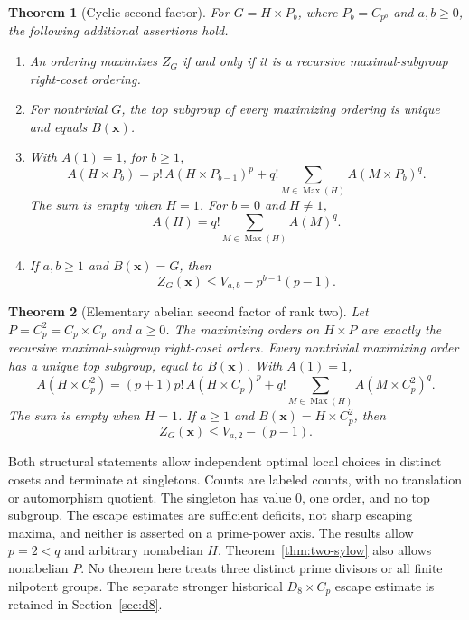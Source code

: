 \documentclass[11pt,letterpaper]{article}
\newtheorem{theorem}{Theorem}
\theoremstyle{definition}\newtheorem{definition}{Definition}
\newcommand{\Max}{\operatorname{Max}}
\begin{document}
\begin{theorem}[Cyclic second factor]\label{thm:main}
For $G=H\times P_b$, where $P_b=C_{p^b}$ and $a,b\ge0$, the following additional assertions hold.
\begin{enumerate}
\item An ordering maximizes $Z_G$ if and only if it is a recursive maximal-subgroup right-coset ordering.
\item For nontrivial $G$, the top subgroup of every maximizing ordering is unique and equals $B(\mathbf{x})$.
\item With $A(1)=1$, for $b\ge1$,
\begin{equation}
A(H\times P_b)=p!\,A(H\times P_{b-1})^p
 +q!\sum_{M\in\Max(H)}A(M\times P_b)^q.\label{eq:count}
\end{equation}
The sum is empty when $H=1$. For $b=0$ and $H\ne1$,
\begin{equation}
A(H)=q!\sum_{M\in\Max(H)}A(M)^q.\label{eq:qcount}
\end{equation}
\item If $a,b\ge1$ and $B(\mathbf{x})=G$, then
\begin{equation}
Z_G(\mathbf{x})\le V_{a,b}-p^{b-1}(p-1).\label{eq:escape}
\end{equation}
\end{enumerate}
\end{theorem}

\begin{theorem}[Elementary abelian second factor of rank two]\label{thm:ranktwo}
Let $P=C_p^2=C_p\times C_p$ and $a\ge0$. The maximizing orders on $H\times P$ are exactly the recursive maximal-subgroup right-coset orders. Every nontrivial maximizing order has a unique top subgroup, equal to $B(\mathbf{x})$. With $A(1)=1$,
\begin{equation}
A(H\times C_p^2)=(p+1)p!\,A(H\times C_p)^p
+q!\sum_{M\in\Max(H)}A(M\times C_p^2)^q.\label{eq:rankcount}
\end{equation}
The sum is empty when $H=1$. If $a\ge1$ and $B(\mathbf{x})=H\times C_p^2$, then
\begin{equation}
Z_G(\mathbf{x})\le V_{a,2}-(p-1).\label{eq:rankescape}
\end{equation}
\end{theorem}

Both structural statements allow independent optimal local choices in distinct cosets and terminate at singletons. Counts are labeled counts, with no translation or automorphism quotient. The singleton has value $0$, one order, and no top subgroup. The escape estimates are sufficient deficits, not sharp escaping maxima, and neither is asserted on a prime-power axis. The results allow $p=2<q$ and arbitrary nonabelian $H$. Theorem~\ref{thm:two-sylow} also allows nonabelian $P$. No theorem here treats three distinct prime divisors or all finite nilpotent groups. The separate stronger historical $D_8\times C_p$ escape estimate is retained in Section~\ref{sec:d8}.
\end{document}
